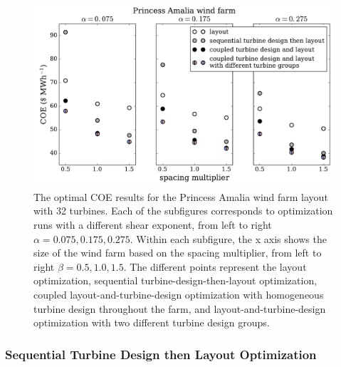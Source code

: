 \begin{figure}[htbp]
  \centering
  \includegraphics[width=\textwidth]{Figures/amalia_results1.pdf}
  \caption{\label{circular_results} The optimal COE results for the Princess Amalia wind farm layout with 32 turbines. Each of the subfigures corresponds to optimization runs with a different shear exponent, from left to right $\alpha=0.075,0.175,0.275$. Within each subfigure, the x axis shows the size of the wind farm based on the spacing multiplier, from left to right $\beta=0.5,1.0,1.5$. The different points represent the layout optimization, sequential turbine-design-then-layout optimization, coupled layout-and-turbine-design optimization with homogeneous turbine design throughout the farm, and layout-and-turbine-design optimization with two different turbine design groups.}
\end{figure}




\subsubsection{Sequential Turbine Design then Layout Optimization}

